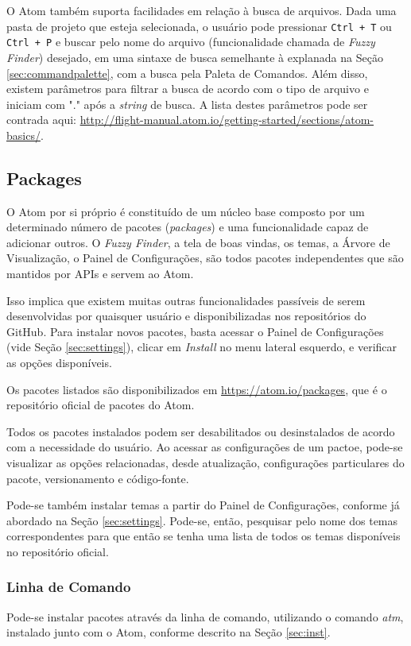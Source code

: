	O Atom também suporta facilidades em relação à busca de arquivos. Dada uma pasta de projeto que esteja selecionada, o usuário pode pressionar \verb|Ctrl + T| ou \verb|Ctrl + P| e buscar pelo nome do arquivo (funcionalidade chamada de \textit{Fuzzy Finder}) desejado, em uma sintaxe de busca semelhante à explanada na Seção \ref{sec:commandpalette}, com a busca pela Paleta de Comandos. Além disso, existem parâmetros para filtrar a busca de acordo com o tipo de arquivo e iniciam com "." após a \textit{string} de busca. A lista destes parâmetros pode ser contrada aqui:  \href{http://flight-manual.atom.io/getting-started/sections/atom-basics/}{http://flight-manual.atom.io/getting-started/sections/atom-basics/}.

	\subsection{Packages}\label{sec:packages}
	O Atom por si próprio é constituído de um núcleo base composto por um determinado número de pacotes (\textit{packages}) e uma funcionalidade capaz de adicionar outros. O \textit{Fuzzy Finder}, a tela de boas vindas, os temas, a Árvore de Visualização, o Painel de Configurações, são todos pacotes independentes que são mantidos por APIs e servem ao Atom.

	Isso implica que existem muitas outras funcionalidades passíveis de serem desenvolvidas por quaisquer usuário e disponibilizadas nos repositórios do GitHub. Para instalar novos pacotes, basta acessar o Painel de Configurações (vide Seção \ref{sec:settings}), clicar em \textit{Install} no menu lateral esquerdo, e verificar as opções disponíveis.

	Os pacotes listados são disponibilizados em \href{https://atom.io/packages}{https://atom.io/packages}, que é o repositório oficial de pacotes do Atom.

	Todos os pacotes instalados podem ser desabilitados ou desinstalados de acordo com a necessidade do usuário. Ao acessar as configurações de um pactoe, pode-se visualizar as opções relacionadas, desde atualização, configurações particulares do pacote, versionamento e código-fonte.

	Pode-se também instalar temas a partir do Painel de Configurações, conforme já abordado na Seção \ref{sec:settings}. Pode-se, então, pesquisar pelo nome dos temas correspondentes para que então se tenha uma lista de todos os temas disponíveis no repositório oficial.

	\subsubsection{Linha de Comando}
	Pode-se instalar pacotes através da linha de comando, utilizando o comando \textit{atm}, instalado junto com o Atom, conforme descrito na Seção \ref{sec:inst}.

